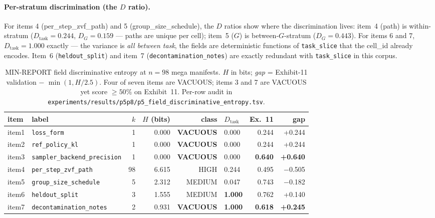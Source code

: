 \paragraph{Per-stratum discrimination (the $D$ ratio).}
For items 4 (per\_step\_zvf\_path) and 5 (group\_size\_schedule), the
$D$ ratios show where the discrimination lives: item~4 (path) is
within-stratum ($D_\text{task}=0.244$, $D_G=0.159$ --- paths are unique
per cell); item~5 ($G$) is between-$G$-stratum
($D_G = 0.443$). For items 6 and 7, $D_\text{task} = 1.000$ exactly ---
the variance is \emph{all between task}, the fields are deterministic
functions of \texttt{task\_slice} that the cell\_id already encodes.
Item~6 (\texttt{heldout\_split}) and item~7
(\texttt{decontamination\_notes}) are exactly redundant with
\texttt{task\_slice} in this corpus.

\begin{table}[t]
\centering\small
\caption{MIN-REPORT field discriminative entropy at $n{=}98$ mega
manifests. $H$ in bits; \emph{gap} = Exhibit-11 validation $-$
$\min(1, H/2.5)$. Four of seven items are VACUOUS; items 3 and 7 are
VACUOUS yet score $\geq 50\%$ on Exhibit~11. Per-row audit in
\texttt{experiments/results/p5p8/p5\_field\_discriminative\_entropy.tsv}.}
\label{tab:p5-discriminative-entropy}
\begin{tabular}{llrrrlrr}
\toprule
item & label & $k$ & $H$ (bits) & class & $D_\text{task}$ & Ex.~11 & gap \\
\midrule
item1 & \texttt{loss\_form}                  & 1  & 0.000 & \textbf{VACUOUS} & 0.000 & 0.244 & +0.244 \\
item2 & \texttt{ref\_policy\_kl}              & 1  & 0.000 & \textbf{VACUOUS} & 0.000 & 0.244 & +0.244 \\
item3 & \texttt{sampler\_backend\_precision}  & 1  & 0.000 & \textbf{VACUOUS} & 0.000 & \textbf{0.640} & \textbf{+0.640} \\
item4 & \texttt{per\_step\_zvf\_path}         & 98 & 6.615 & HIGH            & 0.244 & 0.495 & $-$0.505 \\
item5 & \texttt{group\_size\_schedule}        & 5  & 2.312 & MEDIUM          & 0.047 & 0.743 & $-$0.182 \\
item6 & \texttt{heldout\_split}              & 3  & 1.555 & MEDIUM          & \textbf{1.000} & 0.762 & +0.140 \\
item7 & \texttt{decontamination\_notes}      & 2  & 0.931 & \textbf{VACUOUS} & \textbf{1.000} & \textbf{0.618} & \textbf{+0.245} \\
\bottomrule
\end{tabular}
\end{table}

